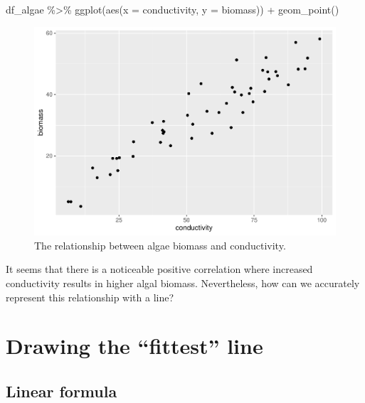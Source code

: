 \documentclass[
]{book}
\newenvironment{Shaded}{\begin{snugshade}}{\end{snugshade}}
\newcommand{\AttributeTok}[1]{\textcolor[rgb]{0.77,0.63,0.00}{#1}}
\newcommand{\FunctionTok}[1]{\textcolor[rgb]{0.00,0.00,0.00}{#1}}
\newcommand{\NormalTok}[1]{#1}
\newcommand{\SpecialCharTok}[1]{\textcolor[rgb]{0.00,0.00,0.00}{#1}}
\begin{document}
\begin{Shaded}
\begin{Highlighting}[]
\NormalTok{df\_algae }\SpecialCharTok{\%\textgreater{}\%} 
  \FunctionTok{ggplot}\NormalTok{(}\FunctionTok{aes}\NormalTok{(}\AttributeTok{x =}\NormalTok{ conductivity,}
             \AttributeTok{y =}\NormalTok{ biomass)) }\SpecialCharTok{+}
  \FunctionTok{geom\_point}\NormalTok{()}
\end{Highlighting}
\end{Shaded}

\begin{figure}

{\centering \includegraphics{_main_files/figure-latex/scatter-1} 

}

\caption{The relationship between algae biomass and conductivity.}\label{fig:scatter}
\end{figure}

It seems that there is a noticeable positive correlation where increased conductivity results in higher algal biomass. Nevertheless, how can we accurately represent this relationship with a line?

\hypertarget{drawing-the-fittest-line}{%
\section{Drawing the ``fittest'' line}\label{drawing-the-fittest-line}}

\hypertarget{linear-formula}{%
\subsection{Linear formula}\label{linear-formula}}
\end{document}

